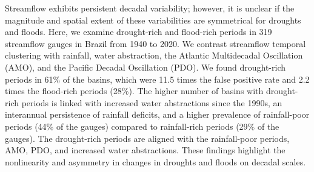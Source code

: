 Streamflow exhibits persistent decadal variability; however, it is unclear if the magnitude and spatial extent of these variabilities are symmetrical for droughts and floods. Here, we examine drought-rich and flood-rich periods in 319 streamflow gauges in Brazil from 1940 to 2020. We contrast streamflow temporal clustering with rainfall, water abstraction, the Atlantic Multidecadal Oscillation (AMO), and the Pacific Decadal Oscillation (PDO). We found drought-rich periods in 61\% of the basins, which were 11.5 times the false positive rate and 2.2 times the flood-rich periods (28\%). The higher number of basins with drought-rich periods is linked with increased water abstractions since the 1990s, an interannual persistence of rainfall deficits, and a higher prevalence of rainfall-poor periods (44\% of the gauges) compared to rainfall-rich periods (29\% of the gauges). The drought-rich periods are aligned with the rainfall-poor periods, AMO, PDO, and increased water abstractions. These findings highlight the nonlinearity and asymmetry in changes in droughts and floods on decadal scales.
\newpage{}
{}
\begin{flushleft}






\end{flushleft}

\noindent

